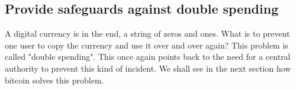 \subsection{Provide safeguards against double spending}
A digital currency is in the end, a string of zeros and ones. What is to prevent one user to copy the currency and use it over and over again? This problem is called "double spending". This once again points back to the need for a central authority to prevent this kind of incident. We shall see in the next section how bitcoin solves this problem.